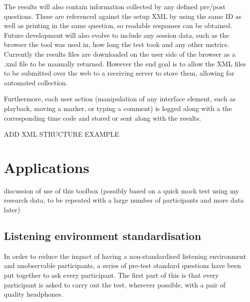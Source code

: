 \documentclass{article}
\begin{document}
The results will also contain information collected by any defined pre/post questions. These are referenced against the setup XML by using the same ID as well as printing in the same question, so readable responses can be obtained. Future development will also evolve to include any session data, such as the browser the tool was used in, how long the test took and any other metrics. Currently the results files are downloaded on the user side of the browser as a .xml file to be manually returned. However the end goal is to allow the XML files to be submitted over the web to a receiving server to store them, allowing for automated collection.

Furthermore, each user action (manipulation of any interface element, such as playback, moving a marker, or typing a comment) is logged along with a the corresponding time code and stored or sent along with the results. %


ADD XML STRUCTURE EXAMPLE

\section{Applications}\label{sec:applications} %
discussion of use of this toolbox (possibly based on a quick mock test using my research data, to be repeated with a large number of participants and more data later)\\

\subsection{Listening environment standardisation}

In order to reduce the impact of having a non-standardised listening environment and unobservable participants, a series of pre-test standard questions have been put together to ask every participant. The first part of this is that every participant is asked to carry out the test, wherever possible, with a pair of quality headphones.
\end{document}
